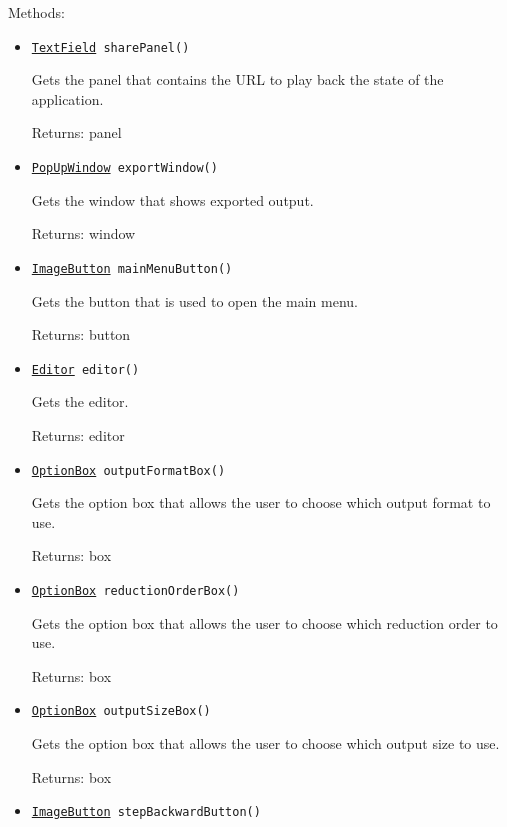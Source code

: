 Methods:
\begin{itemize}
\item \texttt{\hyperref[type:edu.kit.wavelength.client.view.webui.component.TextField]{TextField} sharePanel()}

Gets the panel that contains the URL to play back the state of the application.

Returns: panel

\item \texttt{\hyperref[type:edu.kit.wavelength.client.view.webui.component.PopUpWindow]{PopUpWindow} exportWindow()}

Gets the window that shows exported output.

Returns: window

\item \texttt{\hyperref[type:edu.kit.wavelength.client.view.webui.component.ImageButton]{ImageButton} mainMenuButton()}

Gets the button that is used to open the main menu.

Returns: button

\item \texttt{\hyperref[type:edu.kit.wavelength.client.view.webui.component.Editor]{Editor} editor()}

Gets the editor.

Returns: editor

\item \texttt{\hyperref[type:edu.kit.wavelength.client.view.webui.component.OptionBox]{OptionBox} outputFormatBox()}

Gets the option box that allows the user to choose which output format to use.

Returns: box

\item \texttt{\hyperref[type:edu.kit.wavelength.client.view.webui.component.OptionBox]{OptionBox} reductionOrderBox()}

Gets the option box that allows the user to choose which reduction order to use.

Returns: box

\item \texttt{\hyperref[type:edu.kit.wavelength.client.view.webui.component.OptionBox]{OptionBox} outputSizeBox()}

Gets the option box that allows the user to choose which output size to use.

Returns: box

\item \texttt{\hyperref[type:edu.kit.wavelength.client.view.webui.component.ImageButton]{ImageButton} stepBackwardButton()}


\end{itemize}

